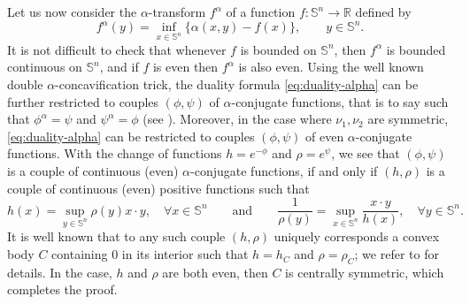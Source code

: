 \documentclass[10pt]{amsart}
\theoremstyle{definition}
\theoremstyle{remark}
\newcommand{\R}{\mathbb{R}}
\begin{document}
Let us now consider the $\alpha$-transform $f^\alpha$ of a function $f : \mathbb{S}^n \to \R$ defined by
\[
f^\alpha(y) = \inf_{x\in \mathbb{S}^n}\{\alpha(x,y)-f(x)\},\qquad y\in \mathbb{S}^n.
\]
It is not difficult to check that whenever $f$ is bounded on $\mathbb{S}^n$, then $f^\alpha$ is bounded continuous on $\mathbb{S}^n$, and if $f$ is even then $f^\alpha$ is also even.
Using the well known double $\alpha$-concavification trick, the duality formula \eqref{eq:duality-alpha} can be further restricted to couples $(\phi,\psi)$ of $\alpha$-conjugate functions, that is to say such that
$\phi^\alpha = \psi$ and $\psi^\alpha = \phi$ (see \cite[Theorem 5.10 (i)]{villani_book}). Moreover, in the case where $\nu_1,\nu_2$ are symmetric, \eqref{eq:duality-alpha} can be restricted to couples $(\phi,\psi)$ of even $\alpha$-conjugate functions. With the change of functions $h= e^{-\phi}$ and $\rho=e^{\psi}$, we see that $(\phi,\psi)$ is a couple of continuous (even) $\alpha$-conjugate functions, if and only if $(h,\rho)$ is a couple of continuous (even) positive functions such that 
\[
h(x)=\sup_{y \in \mathbb{S}^n} \rho(y)x\cdot y,\quad \forall x\in\mathbb{S}^n \qquad \text{and} \qquad \frac{1}{\rho(y)} = \sup_{x \in  \mathbb{S}^n} \frac{x\cdot y}{h(x)}, \quad \forall y\in\mathbb{S}^n.
\]
It is well known that to any such couple $(h,\rho)$ uniquely corresponds a convex body $C$ containing $0$ in its interior such that $h=h_C$ and $\rho=\rho_C$; we refer to \cite[Theorem 2]{Olik07} for details. In the case, $h$ and $\rho$ are both even, then $C$ is centrally symmetric, which completes the proof. 
\endproof
\end{document}
